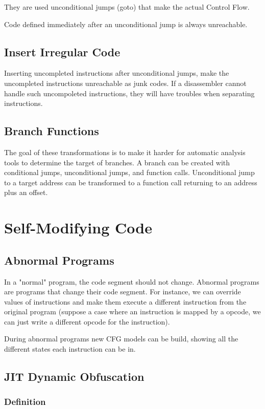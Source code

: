 They are used unconditional jumps (goto) that make the actual Control Flow. 
\par 
Code defined immediately after an unconditional jump is always unreachable.

\subsection{Insert Irregular Code}
Inserting uncompleted instructions after unconditional jumps, make the uncompleted instructions unreachable as junk codes. If a disassembler cannot handle such uncompoleted instructions, they will have troubles when separating instructions. 

\subsection{Branch Functions}
The goal of these transformations is to make it harder for automatic analysis tools to determine the target of branches. 
A branch can be created with conditional jumps, unconditional jumps, and function calls. 
Unconditional jump to a target address can be transformed to a function call returning to an address plus an offset. 

\section{Self-Modifying Code}

\subsection{Abnormal Programs}

In a "normal" program, the code segment should not change.
Abnormal programs are programs that change their code segment. 
For instance, we can override values of instructions and make them execute a different instruction from the original program (suppose a case where an instruction is mapped by a opcode, we can just write a different opcode for the instruction). 
\par
During abnormal programs new CFG models can be build, showing all the different states each instruction can be in.  

\subsection{JIT Dynamic Obfuscation}

\subsubsection{Definition}

